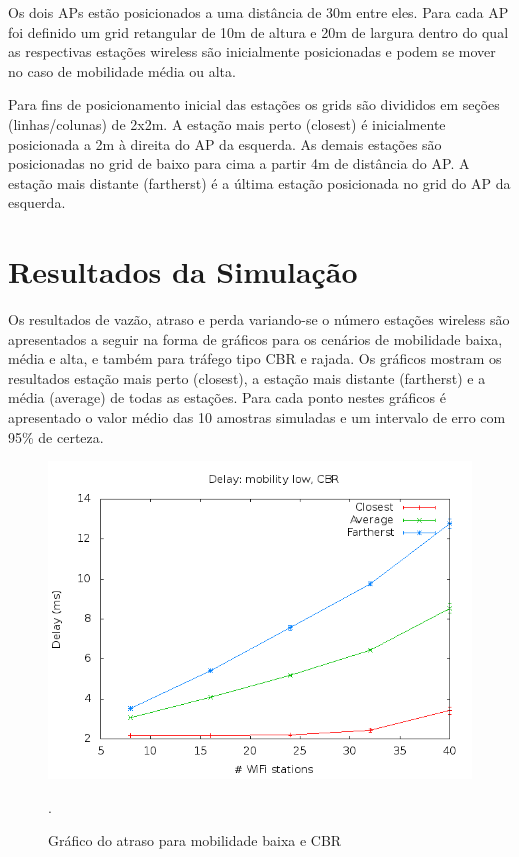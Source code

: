 \documentclass[12pt,twoside,a4paper]{article}
\begin{document}
Os dois APs estão posicionados a uma distância de 30m entre eles. Para cada AP foi definido um grid retangular de 10m de altura e 20m de largura dentro do qual as respectivas estações wireless são inicialmente posicionadas e podem se mover no caso de mobilidade média ou alta.

Para fins de posicionamento inicial das estações os grids são divididos em seções (linhas/colunas) de 2x2m. A estação mais perto (closest) é inicialmente posicionada a 2m à direita do AP da esquerda. As demais estações são posicionadas no grid de baixo para cima a partir 4m de distância do AP. A estação mais distante (fartherst) é a última estação posicionada no grid do AP da esquerda.

\section{Resultados da Simulação}
\label{sec:02}
Os resultados de vazão, atraso e perda variando-se o número estações wireless são apresentados a seguir na forma de gráficos para os cenários de mobilidade baixa, média e alta, e também para tráfego tipo CBR e rajada. Os gráficos mostram os resultados estação mais perto (closest), a estação mais distante (fartherst) e a média (average) de todas as estações. Para cada ponto nestes gráficos é apresentado o valor médio das 10 amostras simuladas e um intervalo de erro com 95\% de certeza.

\begin{figure}[H]
\centering
\includegraphics[scale=0.5]{mo818-delay-mob-0-traf-0}
\caption{Gráfico do atraso para mobilidade baixa e CBR}.
\label{fig:atraso-m0-t0}
\end{figure}
\end{document}
